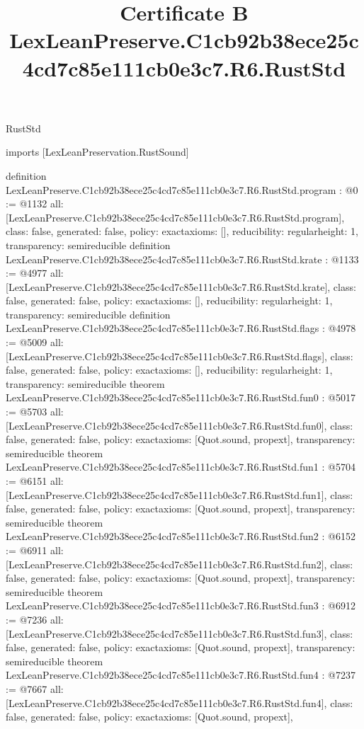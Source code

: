 \begin{lexlean}{RustStd}
\title{Certificate B LexLeanPreserve.C1cb92b38ece25c4cd7c85e111cb0e3c7.R6.RustStd}
\begin{coremodule}
imports [LexLeanPreservation.RustSound]

definition LexLeanPreserve.C1cb92b38ece25c4cd7c85e111cb0e3c7.R6.RustStd.program : @0 := @1132 {
  all: [LexLeanPreserve.C1cb92b38ece25c4cd7c85e111cb0e3c7.R6.RustStd.program],
  class: false,
  generated: false,
  policy: exact{axioms: []},
  reducibility: regular{height: 1},
  transparency: semireducible
}
definition LexLeanPreserve.C1cb92b38ece25c4cd7c85e111cb0e3c7.R6.RustStd.krate : @1133 := @4977 {
  all: [LexLeanPreserve.C1cb92b38ece25c4cd7c85e111cb0e3c7.R6.RustStd.krate],
  class: false,
  generated: false,
  policy: exact{axioms: []},
  reducibility: regular{height: 1},
  transparency: semireducible
}
definition LexLeanPreserve.C1cb92b38ece25c4cd7c85e111cb0e3c7.R6.RustStd.flags : @4978 := @5009 {
  all: [LexLeanPreserve.C1cb92b38ece25c4cd7c85e111cb0e3c7.R6.RustStd.flags],
  class: false,
  generated: false,
  policy: exact{axioms: []},
  reducibility: regular{height: 1},
  transparency: semireducible
}
theorem LexLeanPreserve.C1cb92b38ece25c4cd7c85e111cb0e3c7.R6.RustStd.fun0 : @5017 := @5703 {
  all: [LexLeanPreserve.C1cb92b38ece25c4cd7c85e111cb0e3c7.R6.RustStd.fun0],
  class: false,
  generated: false,
  policy: exact{axioms: [Quot.sound, propext]},
  transparency: semireducible
}
theorem LexLeanPreserve.C1cb92b38ece25c4cd7c85e111cb0e3c7.R6.RustStd.fun1 : @5704 := @6151 {
  all: [LexLeanPreserve.C1cb92b38ece25c4cd7c85e111cb0e3c7.R6.RustStd.fun1],
  class: false,
  generated: false,
  policy: exact{axioms: [Quot.sound, propext]},
  transparency: semireducible
}
theorem LexLeanPreserve.C1cb92b38ece25c4cd7c85e111cb0e3c7.R6.RustStd.fun2 : @6152 := @6911 {
  all: [LexLeanPreserve.C1cb92b38ece25c4cd7c85e111cb0e3c7.R6.RustStd.fun2],
  class: false,
  generated: false,
  policy: exact{axioms: [Quot.sound, propext]},
  transparency: semireducible
}
theorem LexLeanPreserve.C1cb92b38ece25c4cd7c85e111cb0e3c7.R6.RustStd.fun3 : @6912 := @7236 {
  all: [LexLeanPreserve.C1cb92b38ece25c4cd7c85e111cb0e3c7.R6.RustStd.fun3],
  class: false,
  generated: false,
  policy: exact{axioms: [Quot.sound, propext]},
  transparency: semireducible
}
theorem LexLeanPreserve.C1cb92b38ece25c4cd7c85e111cb0e3c7.R6.RustStd.fun4 : @7237 := @7667 {
  all: [LexLeanPreserve.C1cb92b38ece25c4cd7c85e111cb0e3c7.R6.RustStd.fun4],
  class: false,
  generated: false,
  policy: exact{axioms: [Quot.sound, propext]},
}
\end{coremodule}
\end{lexlean}
